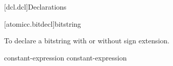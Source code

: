 [dcl.dcl]{Declarations}%


[atomicc.bitdecl]{bitstring}

To declare a bitstring with or without sign extension.

\begin{bnf}
\br
     \terminal{(} constant-expression \terminal{)} \br
     \terminal{(} constant-expression \terminal{)}
\end{bnf}
